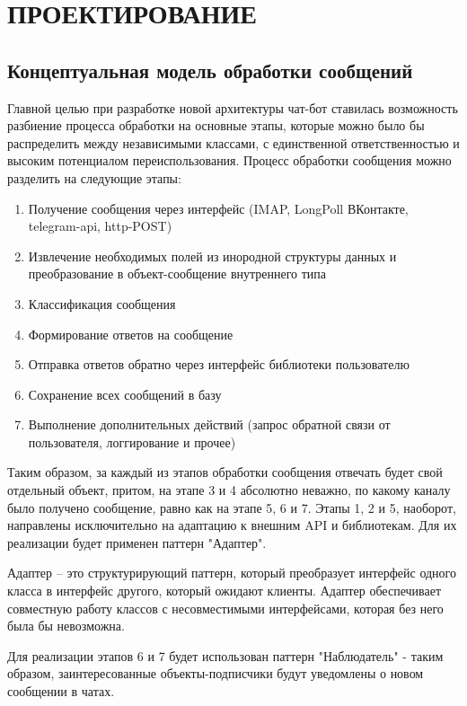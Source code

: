\section{ПРОЕКТИРОВАНИЕ}
    \subsection{Концептуальная модель обработки сообщений}
    Главной целью при разработке новой архитектуры чат-бот ставилась возможность
    разбиение процесса обработки на основные этапы, которые можно было бы
    распределить между независимыми классами, с единственной ответственностью и
    высоким потенциалом переиспользования.
    Процесс обработки сообщения можно разделить на следующие этапы:
    \begin{enumerate}
        \item Получение сообщения через интерфейс (IMAP, LongPoll ВКонтакте, 
        telegram-api, http-POST)
        \item Извлечение необходимых полей из инородной структуры данных и 
        преобразование в объект-сообщение внутреннего типа
        \item Классификация сообщения
        \item Формирование ответов на сообщение
        \item Отправка ответов обратно через интерфейс библиотеки пользователю
        \item Сохранение всех сообщений в базу
        \item Выполнение дополнительных действий (запрос обратной связи от
        пользователя, логгирование и прочее)
    \end{enumerate}

    Таким образом, за каждый из этапов обработки сообщения отвечать будет свой 
    отдельный объект, притом, на этапе 3 и 4 абсолютно неважно, по какому 
    каналу было получено сообщение, равно как на этапе 5, 6 и 7. Этапы 1, 2 и 5, 
    наоборот, направлены исключительно на адаптацию к внешним API и библиотекам.
    Для их реализации будет применен паттерн "Адаптер".

    Адаптер -- это структурирующий паттерн, который 
    преобразует интерфейс одного класса в интерфейс другого, который ожидают
    клиенты. Адаптер обеспечивает совместную работу классов с несовместимыми
    интерфейсами, которая без него была бы невозможна.\cite{design.patterns}
    
    Для реализации этапов
    6 и 7 будет использован паттерн "Наблюдатель" - таким образом,
    заинтересованные объекты-подписчики будут уведомлены о новом сообщении в чатах.
    
